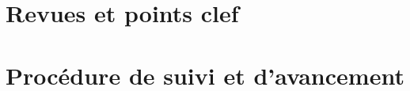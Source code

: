 \documentclass{../../res/univ-projet}
\begin{document}
\section{Revues et points clef}

\section{Proc\'edure de suivi et d'avancement}
\end{document}
